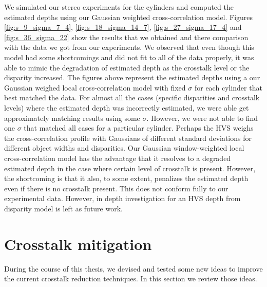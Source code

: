 We simulated our stereo experiments for the cylinders and computed the estimated depths using our Gaussian weighted cross-correlation model. Figures \ref{fig:s_9_sigma_7_4}, \ref{fig:s_18_sigma_14_7}, \ref{fig:s_27_sigma_17_4} and \ref{fig:s_36_sigma_22} show the results that we obtained and there comparison with the data we got from our experiments. We observed that even though this model had some shortcomings and did not fit to all of the data properly, it was able to mimic the degradation of estimated depth as the crosstalk level or the disparity increased. The figures above represent the estimated depths using a our Gaussian weighed local cross-correlation model with fixed $\sigma$ for each cylinder that best matched the data. For almost all the cases (specific disparities and crosstalk levels) where the estimated depth was incorrectly estimated, we were able get approximately matching results using some $\sigma$. However, we were not able to find one $\sigma$ that matched all cases for a particular cylinder. Perhaps the HVS weighs the cross-correlation profile with Gaussians of different standard deviations for different object widths and disparities. Our Gaussian window-weighted local cross-correlation model has the advantage that it resolves to a degraded estimated depth in the case where certain level of crosstalk is present. However, the shortcoming is that it also, to some extent, penalizes the estimated depth even if there is no crosstalk present. This does not conform fully to our experimental data. However, in depth investigation for an HVS depth from disparity model is left as future work.
\pagebreak

\section{Crosstalk mitigation}

During the course of this thesis, we devised and tested some new ideas to improve the current crosstalk reduction techniques. In this section we review those ideas.

